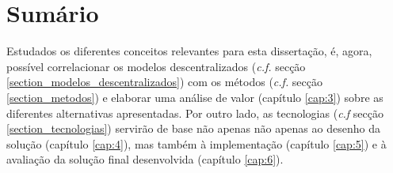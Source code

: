 \section{Sumário}
Estudados os diferentes conceitos relevantes para esta dissertação, é, agora, possível correlacionar os modelos descentralizados (\emph{c.f.} secção \ref{section_modelos_descentralizados}) com os métodos (\emph{c.f.} secção \ref{section_metodos}) e elaborar uma análise de valor (capítulo \ref{cap:3}) sobre as diferentes alternativas apresentadas. Por outro lado, as tecnologias (\emph{c.f} secção \ref{section_tecnologias}) servirão de base não apenas não apenas ao desenho da solução (capítulo \ref{cap:4}), mas também à implementação (capítulo \ref{cap:5}) e à avaliação da solução final desenvolvida (capítulo \ref{cap:6}).






